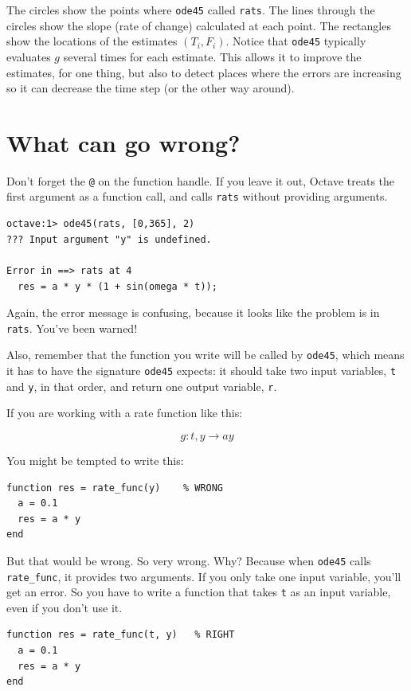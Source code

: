 \documentclass{book}
\begin{document}
The circles show the points where {\tt ode45} called {\tt rats}.
The lines through the circles show the slope (rate of change) calculated
at each point. The rectangles show the locations of the estimates
$(T_i, F_i)$. Notice that {\tt ode45} typically evaluates
$g$ several times for each estimate. This allows it to improve the
estimates, for one thing, but also to detect places where the errors
are increasing so it can decrease the time step (or the other
way around).


\section{What can go wrong?}

Don't forget the {\tt @} on the function handle.
If you leave it out, Octave treats the first argument as a function
call, and calls {\tt rats} without providing arguments.

\begin{verbatim}
octave:1> ode45(rats, [0,365], 2)
??? Input argument "y" is undefined.

Error in ==> rats at 4
  res = a * y * (1 + sin(omega * t));
\end{verbatim}

Again, the error message is confusing, because it looks like the problem
is in {\tt rats}. You've been warned!

Also, remember that the function you write will be called by
{\tt ode45}, which means it has to have the signature {\tt ode45}
expects: it should take two input variables, {\tt t} and {\tt y},
in that order, and return one output variable, {\tt r}.

If you are working with a rate function like this:

\[ g : t, y \to a y \]

You might be tempted to write this:

\begin{verbatim}
function res = rate_func(y)    % WRONG
  a = 0.1
  res = a * y
end
\end{verbatim}

But that would be wrong. So very wrong. Why? Because
when {\tt ode45} calls {\tt rate\_func}, it provides two arguments.
If you only take one input variable, you'll get an error. So
you have to write a function that takes {\tt t} as an input
variable, even if you don't use it.

\begin{verbatim}
function res = rate_func(t, y)   % RIGHT
  a = 0.1
  res = a * y
end
\end{verbatim}
\end{document}
